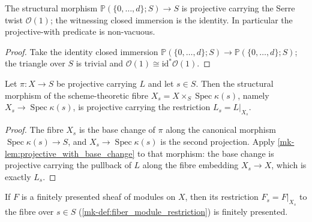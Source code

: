 \begin{lemma}
  \label{mk-lem:projective_space_is_projective}
  \leanok
  The structural morphism \(\mathbb{P}(\{0,\dots,d\}; S) \to S\) is projective
  carrying the Serre twist \(\mathcal{O}(1)\); the witnessing closed immersion
  is the identity.  In particular the projective-with predicate is
  non-vacuous.
\end{lemma}

\begin{proof}
  \leanok
  Take the identity closed immersion
  \(\mathbb{P}(\{0,\dots,d\}; S) \to \mathbb{P}(\{0,\dots,d\}; S)\); the
  triangle over \(S\) is trivial and \(\mathcal{O}(1) \cong
  \mathrm{id}^* \mathcal{O}(1)\).
\end{proof}

\begin{lemma}
  \label{mk-lem:projective_with_fiber}
  \leanok
  Let \(\pi : X \to S\) be projective carrying \(L\) and let \(s \in S\).  Then
  the structural morphism of the scheme-theoretic fibre
  \(X_s = X \times_S \operatorname{Spec}\kappa(s)\), namely
  \(X_s \to \operatorname{Spec}\kappa(s)\), is projective carrying the
  restriction \(L_s = L|_{X_s}\).
\end{lemma}

\begin{proof}
  \leanok
  The fibre \(X_s\) is the base change of \(\pi\) along the canonical morphism
  \(\operatorname{Spec}\kappa(s) \to S\), and \(X_s \to
  \operatorname{Spec}\kappa(s)\) is the second projection.  Apply
  \ref{mk-lem:projective_with_base_change} to that morphism: the base change is
  projective carrying the pullback of \(L\) along the fibre embedding
  \(X_s \to X\), which is exactly \(L_s\).
\end{proof}

\begin{lemma}
  \label{mk-lem:fiberModule_finitePresentation}
  \leanok
  If \(F\) is a finitely presented sheaf of modules on \(X\), then its
  restriction \(F_s = F|_{X_s}\) to the fibre over \(s \in S\)
  (\ref{mk-def:fiber_module_restriction}) is finitely presented.
\end{lemma}

